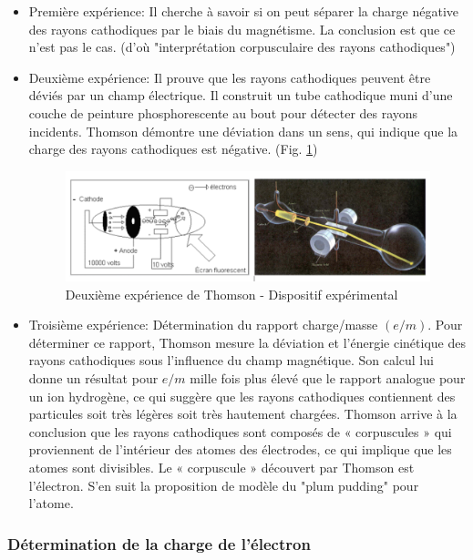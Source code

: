 \begin{itemize}
    \item Première expérience: Il cherche à savoir si on peut séparer la charge négative des rayons cathodiques par le biais du magnétisme. La conclusion est que ce n'est pas le cas. (d'où "interprétation corpusculaire des rayons cathodiques")
    \item Deuxième expérience: Il prouve que les rayons cathodiques peuvent être déviés par un champ électrique. Il construit un tube cathodique muni d'une couche de peinture phosphorescente au bout pour détecter des rayons incidents. Thomson démontre une déviation dans un sens, qui indique que la charge des rayons cathodiques est négative. (Fig. \ref{fig:thompson_exp_2})
    
    \begin{figure}[ht]
        \centering
        \includegraphics[scale=0.60]{Images1/2eexpthomson.PNG}
        \caption{Deuxième expérience de Thomson - Dispositif expérimental}
        \label{fig:thompson_exp_2}
    \end{figure}

    \item Troisième expérience: Détermination du rapport charge/masse $(e/m)$. Pour déterminer ce rapport, Thomson mesure la déviation et l'énergie cinétique des rayons cathodiques sous l'influence du champ magnétique. Son calcul lui donne un résultat pour $e/m$ mille fois plus élevé que le rapport analogue pour un ion hydrogène, ce qui suggère que les rayons cathodiques contiennent des particules soit très légères soit très hautement chargées. Thomson arrive à la conclusion que les rayons cathodiques sont composés de « corpuscules » qui proviennent de l'intérieur des atomes des électrodes, ce qui implique que les atomes sont divisibles. Le « corpuscule » découvert par Thomson est l'électron.
    S'en suit la proposition de modèle du "plum pudding" pour l'atome. 
\end{itemize}
    
\subsubsection*{Détermination de la charge de l'électron}

